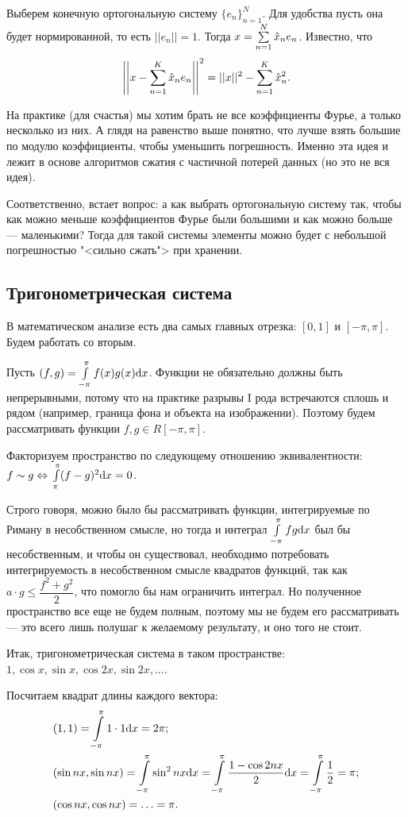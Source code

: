 Выберем конечную ортогональную систему $\{e_n\}_{n=1}^N$. Для удобства пусть она будет нормированной, то есть $||e_n|| = 1$. Тогда $x = \sum\limits_{n = 1}^{N} \hat{x}_ne_n$. Известно, что 
$$\left|\left|x - \sum\limits_{n=1}^{K}\hat{x}_ne_n\right|\right|^2 = ||x||^2 - \sum\limits_{n=1}^{K}\hat{x}_n^2.$$

На практике (для счастья) мы хотим брать не все коэффициенты Фурье, а только несколько из них. А глядя на равенство выше понятно, что лучше взять большие по модулю коэффициенты, чтобы уменьшить погрешность. Именно эта идея и лежит в основе алгоритмов сжатия с частичной потерей данных (но это не вся идея).

Соответственно, встает вопрос: а как выбрать ортогональную систему так, чтобы как можно меньше коэффициентов Фурье были большими и как можно больше --- маленькими? Тогда для такой системы элементы можно будет с небольшой погрешностью "<сильно сжать"> при хранении.

\subsection{Тригонометрическая система}
В математическом анализе есть два самых главных отрезка: $[0, 1]$ и $[-\pi, \pi]$. Будем работать со вторым.

Пусть $(f, g) = \int\limits_{-\pi}^{\pi} f(x)g(x) \mathrm{d} x$. Функции не обязательно должны быть непрерывными, потому что на практике разрывы I рода встречаются сплошь и рядом (например, граница фона и объекта на изображении). Поэтому будем рассматривать функции $f, g \in R[-\pi, \pi]$.

Факторизуем пространство по следующему отношению эквивалентности: $f \sim g \Leftrightarrow \\ \int\limits_{\pi}^{\pi}(f - g)^2 \mathrm{d} x = 0$. 

Строго говоря, можно было бы рассматривать функции, интегрируемые по Риману в несобственном смысле, но тогда и интеграл $\int\limits_{-\pi}^{\pi}fg \mathrm{d} x$ был бы несобственным, и чтобы он существовал, необходимо потребовать интегрируемость в несобственном смысле квадратов функций, так как $a\cdot g \leq \dfrac{f^2 + g^2}{2}$, что помогло бы нам ограничить интеграл. Но полученное пространство все еще не будем полным, поэтому мы не будем его рассматривать --- это всего лишь полушаг к желаемому результату, и оно того не стоит.

Итак, тригонометрическая система в таком пространстве: $1, \cos x, \sin x, \cos 2x, \sin 2x, \ldots$.

Посчитаем квадрат длины каждого вектора:
\begin{align*}
&(1, 1) =  \int\limits_{-\pi}^{\pi} 1 \cdot 1 \mathrm{d} x = 2\pi;\\
&(\sin nx, \sin nx) =  \int\limits_{-\pi}^{\pi} \sin^2 nx \mathrm{d} x =  \int\limits_{-\pi}^{\pi} \frac{1 - \cos 2nx}{2} \mathrm{d} x =  \int\limits_{-\pi}^{\pi} \dfrac{1}{2} = \pi;\\
&(\cos nx, \cos nx) = \ldots = \pi.
\end{align*}

